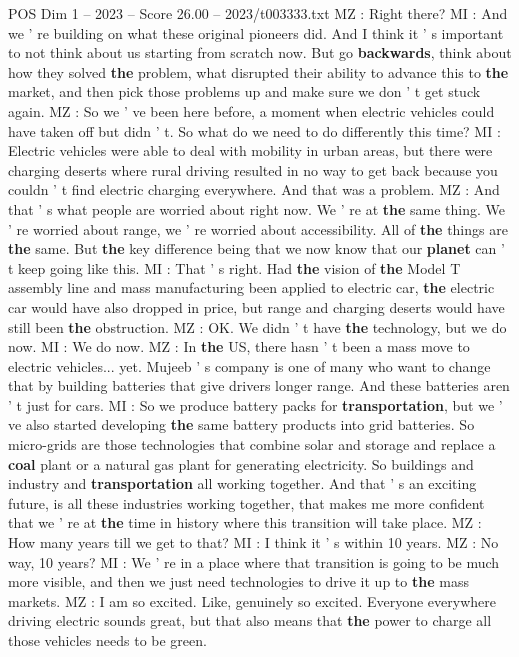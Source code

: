 \begin{textsample}{POS Dim 1 – 2023 – Score 26.00 – 2023/t003333.txt}
MZ : Right there?
MI : And we ' re building on what these original pioneers did.
And I think it ' s important to not think about us starting from scratch now.
But go \textbf{backwards}, think about how they solved \textbf{the} problem, what disrupted their ability to advance this to \textbf{the} market, and then pick those problems up and make sure we don ' t get stuck again.
MZ : So we ' ve been here before, a moment when electric vehicles could have taken off but didn ' t.
So what do we need to do differently this time?
MI : Electric vehicles were able to deal with mobility in urban areas, but there were charging deserts where rural driving resulted in no way to get back because you couldn ' t find electric charging everywhere.
And that was a problem.
MZ : And that ' s what people are worried about right now.
We ' re at \textbf{the} same thing.
We ' re worried about range, we ' re worried about accessibility.
All of \textbf{the} things are \textbf{the} same.
But \textbf{the} key difference being that we now know that our \textbf{planet} can ' t keep going like this.
MI : That ' s right.
Had \textbf{the} vision of \textbf{the} Model T assembly line and mass manufacturing been applied to electric car, \textbf{the} electric car would have also dropped in price, but range and charging deserts would have still been \textbf{the} obstruction.
MZ : OK.
We didn ' t have \textbf{the} technology, but we do now.
MI : We do now.
MZ : In \textbf{the} US, there hasn ' t been a mass move to electric vehicles... yet.
Mujeeb ' s company is one of many who want to change that by building batteries that give drivers longer range.
And these batteries aren ' t just for cars.
MI : So we produce battery packs for \textbf{transportation}, but we ' ve also started developing \textbf{the} same battery products into grid batteries.
So micro-grids are those technologies that combine solar and storage and replace a \textbf{coal} plant or a natural gas plant for generating electricity.
So buildings and industry and \textbf{transportation} all working together.
And that ' s an exciting future, is all these industries working together, that makes me more confident that we ' re at \textbf{the} time in history where this transition will take place.
MZ : How many years till we get to that?
MI : I think it ' s within 10 years.
MZ : No way, 10 years?
MI : We ' re in a place where that transition is going to be much more visible, and then we just need technologies to drive it up to \textbf{the} mass markets.
MZ : I am so excited.
Like, genuinely so excited.
Everyone everywhere driving electric sounds great, but that also means that \textbf{the} power to charge all those vehicles needs to be green.

\end{textsample}
